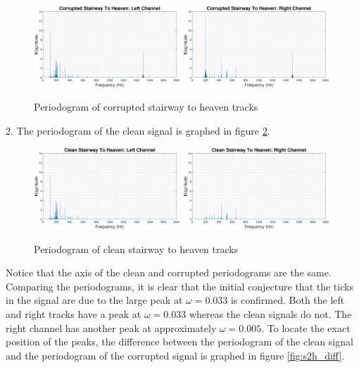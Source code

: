 \documentclass{article}
\begin{document}
\begin{figure}[H]
    \centering
    \includegraphics[width=0.49\textwidth]{corrupted_s2h_left}
    \includegraphics[width=0.49\textwidth]{corrupted_s2h_right}
    \caption{Periodogram of corrupted stairway to heaven tracks}
    \label{fig:s2h_corrupt}
\end{figure}

2. The periodogram of the clean signal is graphed in figure \ref{fig:s2h_clean}.

\begin{figure}[H]
    \centering
    \includegraphics[width=0.49\textwidth]{clean_s2h_left}
    \includegraphics[width=0.49\textwidth]{clean_s2h_right}
    \caption{Periodogram of clean stairway to heaven tracks}
    \label{fig:s2h_clean}
\end{figure}

Notice that the axis of the clean and corrupted periodograms are the same. Comparing the periodograms, it is clear that the initial conjecture that the ticks in the signal are due to the large peak at $\omega=0.033$ is confirmed. Both the left and right tracks have a peak at $\omega = 0.033$ whereas the clean signals do not. The right channel has another peak at approximately $\omega = 0.005$. To locate the exact position of the peaks, the difference between the periodogram of the clean signal and the periodogram of the corrupted signal is graphed in figure \ref{fig:s2h_diff}.
\end{document}
